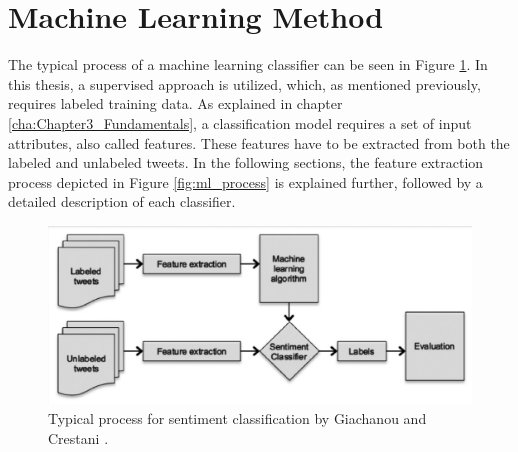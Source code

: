 \section{Machine Learning Method}
The typical process of a machine learning classifier can be seen in Figure \ref{fig:ml_approach}. In this thesis, a supervised approach is utilized, which, as mentioned previously, requires labeled training data.
As explained in chapter \ref{cha:Chapter3_Fundamentals}, a classification model requires a set of input attributes, also called features. These features have to be extracted from both the labeled and unlabeled tweets. In the following sections, the feature extraction process depicted in Figure \ref{fig:ml_process} is explained further, followed by a detailed description of each classifier.
\begin{figure}
    \centering
    \includegraphics[scale=0.5]{Images/ML_approach.png}
    \caption{Typical process for sentiment classification by Giachanou and Crestani \cite[p.~28:3]{DBLP:journals/csur/GiachanouC16}.}
    \label{fig:ml_approach}
\end{figure}


